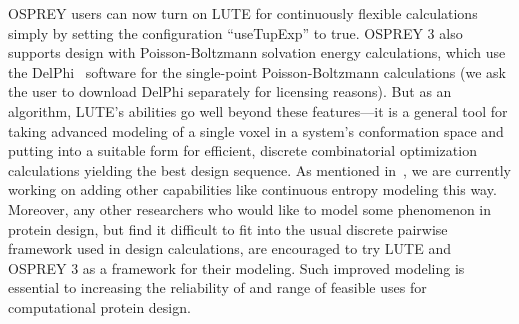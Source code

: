 OSPREY users can now turn on LUTE for continuously flexible calculations simply by setting the configuration ``useTupExp'' to true.  OSPREY 3 also supports design with Poisson-Boltzmann solvation energy calculations, which use the DelPhi~\cite{OSOR,DelPhi_surface} software for the single-point Poisson-Boltzmann calculations (we ask the user to download DelPhi separately for licensing reasons).  But as an algorithm, LUTE's abilities go well beyond these features---it is a general tool for taking advanced modeling of a single voxel in a system's conformation space and putting into a suitable form for efficient, discrete combinatorial optimization calculations yielding the best design sequence.  As mentioned in~\cite{LUTE_RECOMB}, we are currently working on adding other capabilities like continuous entropy modeling this way.  Moreover, any other researchers who would like to model some phenomenon in protein design, but find it difficult to fit into the usual discrete pairwise framework used in design calculations, are encouraged to try LUTE and OSPREY 3 as a framework for their modeling.  Such improved modeling is essential to increasing the reliability of and range of feasible uses for computational protein design.  
